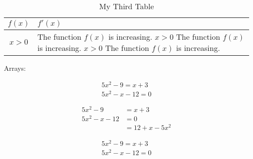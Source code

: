 \documentclass[11pt]{article}
\begin{document}
\begin{table}[H]

\centering
\def\arraystretch{1.5}
\begin{tabular}{|c||p{3in}|}
\hline
$f(x)$&$f'(x)$\\ \hline
$x>0$& The function $f(x)$ is increasing. $x>0$ The function $f(x)$ is increasing. $x>0$ The function $f(x)$ is increasing.\\ \hline
\end{tabular}
\caption{My Third Table}
\end{table}

Arrays:

\begin{align}
5x^2-9=x+3\\
5x^2-x-12=0
\end{align}


\begin{align*}
5x^2-9&=x+3\\
5x^2-x-12&=0\\
&=12+x-5x^2
\end{align*}


\begin{align}
5x^2-9=x+3\\
5x^2-x-12=0
\end{align}
\end{document}
